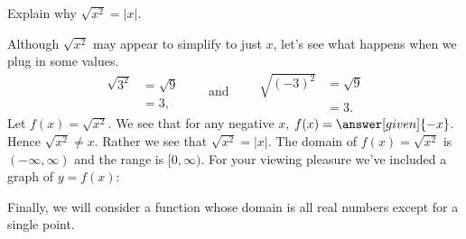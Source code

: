 \documentclass{ximera}
\begin{document}
\begin{example}
  Explain why $\sqrt{x^2} = |x|$.
  \begin{explanation}
    Although $\sqrt{x^2}$ may appear to simplify to just $x$, let's see
    what happens when we plug in some values.
    \[
    \begin{aligned}
    \sqrt{3^2} &= \sqrt{9}\\
    &=3,
    \end{aligned}
    \qquad\text{and}\qquad
    \begin{aligned}
      \sqrt{(-3)^2} &= \sqrt{9}\\
      &=3.
    \end{aligned}
    \]
    Let $f(x)=\sqrt{x^2}$. We see that for any negative $x$, $f(x)=\answer[given]{-x}$.  Hence
    $\sqrt{x^2}\ne x$. Rather we see that $\sqrt{x^2} = |x|$.  The
    domain of $f(x)=\sqrt{x^2}$ is $(-\infty,\infty)$ and the range is
    $[0,\infty)$.  For your viewing pleasure we've included a graph of
      $y=f(x)$:
    \begin{image}
    \end{image}
  \end{explanation}
\end{example}

Finally, we will consider a function whose domain is all real numbers
except for a single point.
\end{document}
